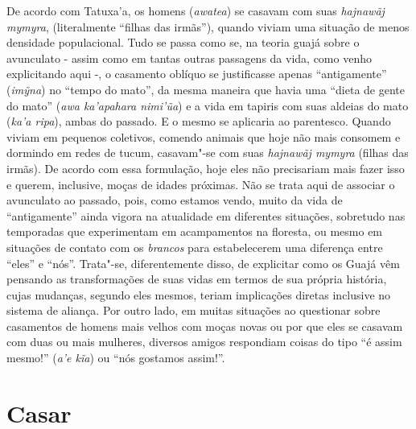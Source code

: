 De acordo com Tatuxa'a, os homens (\emph{awatea}) se casavam com suas
\emph{hajnawãj mymyra}, (literalmente ``filhas das irmãs''), quando
viviam uma situação de menos densidade populacional. Tudo se passa como
se, na teoria guajá sobre o avunculato - assim como em tantas outras
passagens da vida, como venho explicitando aqui -, o casamento oblíquo
se justificasse apenas ``antigamente'' (\emph{imỹna}) no ``tempo do mato'',
da mesma maneira que havia uma ``dieta de gente do mato'' (\emph{awa
ka'apahara nimi'ũa}) e a vida em tapiris com suas aldeias do mato
(\emph{ka'a ripa}), ambas do passado. E o mesmo se aplicaria ao
parentesco. Quando viviam em pequenos coletivos, comendo animais que
hoje não mais consomem e dormindo em redes de tucum, casavam"-se com suas
\emph{hajnawãj mymyra} (filhas das irmãs). De acordo com essa
formulação, hoje eles não precisariam mais fazer isso e querem,
inclusive, moças de idades próximas. Não se trata aqui de associar o
avunculato ao passado, pois, como estamos vendo, muito da vida de
``antigamente'' ainda vigora na atualidade em diferentes situações,
sobretudo nas temporadas que experimentam em acampamentos na floresta,
ou mesmo em situações de contato com os \emph{brancos} para
estabelecerem uma diferença entre ``eles'' e ``nós''. Trata"-se,
diferentemente disso, de explicitar como os Guajá vêm pensando as
transformações de suas vidas em termos de sua própria história, cujas
mudanças, segundo eles mesmos, teriam implicações diretas inclusive no
sistema de aliança. Por outro lado, em muitas situações ao questionar
sobre casamentos de homens mais velhos com moças novas ou por que eles
se casavam com duas ou mais mulheres, diversos amigos respondiam coisas
do tipo ``é assim mesmo!'' (\emph{a'e kĩa}) ou ``nós gostamos assim!''.

\section{Casar}\label{casar}

